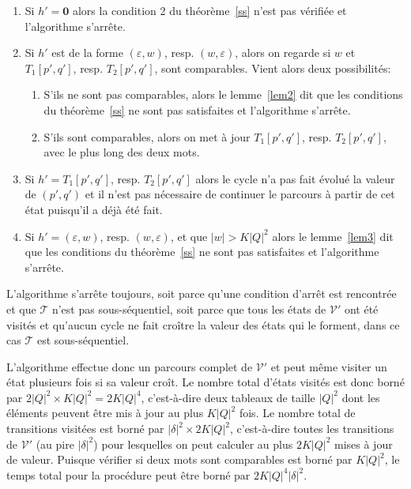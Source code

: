 		\begin{enumerate}
			\item Si $h' = \mathbf{0}$ alors la condition 2 du théorème~\ref{ss} n'est pas vérifiée et l'algorithme s'arrête.
			\item Si $h'$ est de la forme $(\varepsilon,w)$, resp. $(w,\varepsilon)$, alors on regarde si $w$ et $T_1[p',q']$, resp. $T_2[p',q']$, sont comparables. Vient alors deux possibilités:
			\begin{enumerate}
				\item S'ils ne sont pas comparables, alors le lemme~\ref{lem2} dit que les conditions du théorème~\ref{ss} ne sont pas satisfaites et l'algorithme s'arrête.
				\item S'ils sont comparables, alors on met à jour $T_1[p',q']$, resp. $T_2[p',q']$, avec le plus long des deux mots.
			\end{enumerate}
			\item Si $h' = T_1[p',q']$, resp. $T_2[p',q']$ alors le cycle n'a pas fait évolué la valeur de $(p',q')$ et il n'est pas nécessaire de continuer le parcours à partir de cet état puisqu'il a déjà été fait.
			\item Si $h' = (\varepsilon, w)$, resp. $(w, \varepsilon)$, et que $|w| > K|Q|^2$ alors le lemme~\ref{lem3} dit que les conditions du théorème~\ref{ss} ne sont pas satisfaites et l'algorithme s'arrête.
		\end{enumerate}
		
		L'algorithme s'arrête toujours, soit parce qu'une condition d'arrêt est rencontrée et que $\mathscr{T}$ n'est pas sous-séquentiel, soit parce que tous les états de $\mathscr{V'}$ ont été visités et qu'aucun cycle ne fait croître la valeur des états qui le forment, dans ce cas $\mathscr{T}$ est sous-séquentiel.
		
		L'algorithme effectue donc un parcours complet de $\mathscr{V'}$ et peut même visiter un état plusieurs fois si sa valeur croît. Le nombre total d'états visités est donc borné par $2|Q|^2 \times K|Q|^2 = 2K|Q|^4$, c'est-à-dire deux tableaux de taille $|Q|^2$ dont les éléments peuvent être mis à jour au plus $K|Q|^2$ fois. Le nombre total de transitions visitées est borné par $|\delta|^2 \times 2K|Q|^2$, c'est-à-dire toutes les transitions de $\mathscr{V'}$ (au pire $|\delta|^2$) pour lesquelles on peut calculer au plus $2K|Q|^2$ mises à jour de valeur. Puisque vérifier si deux mots sont comparables est borné par $K|Q|^2$, le temps total pour la procédure peut être borné par $2K|Q|^4|\delta|^2$.
		
